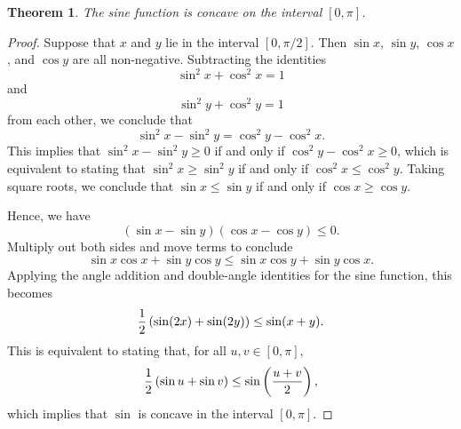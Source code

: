 \documentclass[12pt]{article}
\newtheorem{thm}{Theorem}
\begin{document}
\begin{thm}
The sine function is concave on the interval $[0, \pi]$.
\end{thm}

\begin{proof}
Suppose that $x$ and $y$ lie in the interval $[0, \pi/2]$.
Then $\sin x$, $\sin y$, $\cos x$, and $\cos y$ are all
non-negative.  Subtracting the identities
\[
\sin^2 x + \cos^2 x = 1
\]
and 
\[
\sin^2 y + \cos^2 y = 1
\]
from each other, we conclude that
\[
\sin^2 x - \sin^2 y = \cos^2 y - \cos^2 x .
\]
This implies that $\sin^2 x - \sin^2 y \ge 0$ if and only if
$\cos^2 y - \cos^2 x \ge 0$, which is equivalent to stating
that $\sin^2 x \ge \sin^2 y$ if and only if $\cos^2 x \le
\cos^2 y$.  Taking square roots, we conclude that 
$\sin x \le \sin y$ if and only if
$\cos x \ge \cos y$. 

Hence, we have
\[
(\sin x - \sin y) (\cos x - \cos y) \le 0 .
\]
Multiply out both sides and move terms to conclude
\[
\sin x \cos x + \sin y \cos y \le \sin x \cos y + \sin y \cos x .
\]
Applying the angle addition and double-angle identities for the
sine function, this becomes
\[
{1 \over 2} \left( \sin (2x) + \sin (2y) \right) \le \sin (x + y) .
\]
This is equivalent to stating that, for all
$u,v \in [0, \pi]$,
\[
{1 \over 2} \left( \sin u + \sin v \right) \le
\sin \left( {u + v \over 2} \right) ,
\]
which implies that $\sin$ is concave in the interval $[0, \pi]$.
\end{proof}
\end{document}
